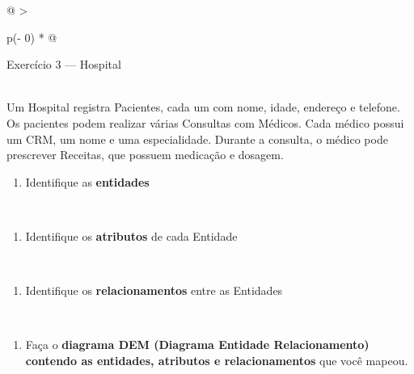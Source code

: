\documentclass[
]{book}
\providecommand{\tightlist}{%
  \setlength{\itemsep}{0pt}\setlength{\parskip}{0pt}}
\begin{document}
\begin{longtable}[]{@{}
  >{\raggedright\arraybackslash}p{(\columnwidth - 0\tabcolsep) * }@{}}
\toprule\noalign{}
\begin{minipage}[b]{\linewidth}\raggedright
Exercício 3 --- Hospital
\end{minipage} \\
\midrule\noalign{}
\endhead
\bottomrule\noalign{}
\endlastfoot
Um Hospital registra Pacientes, cada um com nome, idade, endereço e telefone. Os pacientes podem realizar várias Consultas com Médicos. Cada médico possui um CRM, um nome e uma especialidade. Durante a consulta, o médico pode prescrever Receitas, que possuem medicação e dosagem. \\
\begin{minipage}[t]{\linewidth}\raggedright
\begin{enumerate}
\def\labelenumi{\alph{enumi})}
\tightlist
\item
  Identifique as \textbf{entidades}
\end{enumerate}
\end{minipage} \\
\begin{minipage}[t]{\linewidth}\raggedright
\begin{enumerate}
\def\labelenumi{\alph{enumi})}
\setcounter{enumi}{1}
\tightlist
\item
  Identifique os \textbf{atributos} de cada Entidade
\end{enumerate}
\end{minipage} \\
\begin{minipage}[t]{\linewidth}\raggedright
\begin{enumerate}
\def\labelenumi{\alph{enumi})}
\setcounter{enumi}{2}
\tightlist
\item
  Identifique os \textbf{relacionamentos} entre as Entidades
\end{enumerate}
\end{minipage} \\
\begin{minipage}[t]{\linewidth}\raggedright
\begin{enumerate}
\def\labelenumi{\alph{enumi})}
\setcounter{enumi}{4}
\tightlist
\item
  Faça o \textbf{diagrama DEM (Diagrama Entidade Relacionamento) contendo as entidades, atributos e relacionamentos} que você mapeou.
\end{enumerate}
\end{minipage} \\
\end{longtable}
\end{document}
